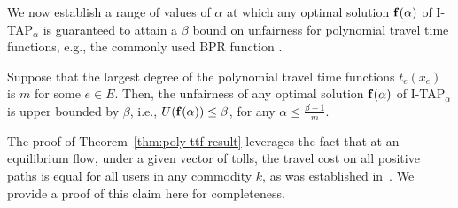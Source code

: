\documentclass{article}
\newif\ifarxiv   %
\begin{document}
\ifarxiv 
The bound on the inefficiency ratio obtained from Theorem~\ref{thm:eff-upper-bound} is depicted in Figure~\ref{fig:ineff_ratio}. Note  that in order to obtain the value of the convex combination parameter $\alpha^*$ at which the two upper bounds on the inefficiency ratio are equal we need to impose the constraint $\Bar{\rho} = \frac{1-\alpha^*}{\alpha^*}\cdot \frac{\objue(\x(1)) - \objue(\x(0))}{\objso(\x(1))}$, which yields that $\alpha^* = \frac{\objue(\x(1)) - \objue(\x(0))}{\objso(\x(0)) + \objue(\x(1)) - \objue(\x(0))}$.

\begin{figure}[tbh!]
      \centering
      \texttt{[image: Fig/inefficiency\_ratio\_bound.png]}
      \vspace{-5pt}
      \caption{\small \sf Upper bound on the inefficiency ratio of the optimal solution $\x(\alpha)$ of the problem I-TAP$_{\alpha}$ for $\alpha \in [0, 1]$}
      \label{fig:ineff_ratio} %
   \end{figure}
\fi

\ifarxiv Having established a worst case performance guarantee for I-TAP in terms of the inefficiency ratio, we \else We \fi now establish a range of values of $\alpha$ at which any optimal solution $\mathbf{f}(\alpha)$ of I-TAP$_{\alpha}$ is guaranteed to attain a $\beta$ bound on \ifarxiv unfairness. In particular, we specialize the following result to polynomial travel time functions, e.g., the commonly used BPR function \cite{Sheffi1985}. \else unfairness for polynomial travel time functions, e.g., the commonly used BPR function \cite{Sheffi1985}. \fi 

\begin{theorem}  \label{thm:poly-ttf-result}
Suppose that the largest degree of the polynomial travel time functions $t_e(x_e)$ is $m$ for some $e \in E$. Then, the unfairness of any optimal solution $\mathbf{f}(\alpha)$ of I-TAP$_{\alpha}$ is upper bounded by $\beta$, i.e., $U(\mathbf{f}(\alpha)) \leq \beta$, for any $\alpha \leq \frac{\beta - 1}{m}$.
\end{theorem}


The proof of Theorem~\ref{thm:poly-ttf-result} leverages the fact that at an equilibrium flow, under a given vector of tolls, the travel cost on all positive paths is equal for all users in any commodity $k$, as was established in~\cite[Lemma 2]{basu2017reconciling}. We provide a proof of this claim here for completeness.
\end{document}
